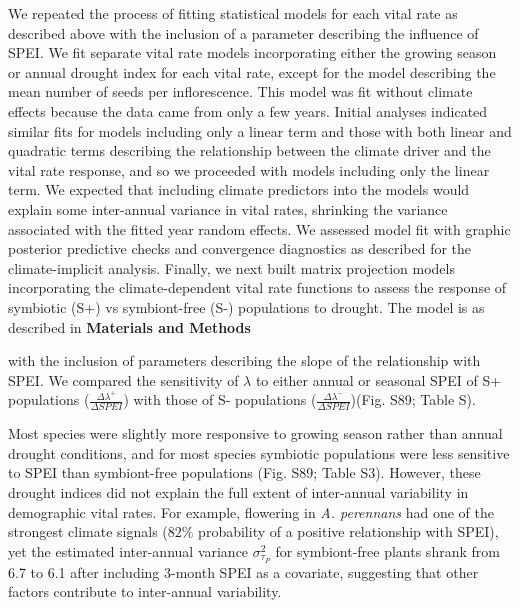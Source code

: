\documentclass[lineno,sn-nature]{sn-jnl}%
\providecommand{\DIFadd}[1]{{\protect\color{blue}#1}} %
\providecommand{\DIFadd}[1]{{\protect\color{blue}\uwave{#1}}} %
\begin{document}
\begin{appendices}
{	\DIFadd{We repeated the process of fitting statistical models for each vital rate as described above with the inclusion of a parameter describing the influence of SPEI. 
	We fit separate vital rate models incorporating either the growing season or annual drought index for each vital rate, except for the model describing the mean number of seeds per inflorescence. 
	This model was fit without climate effects because the data came from only a few years.
	Initial analyses indicated similar fits for models including only a linear term and those with both linear and quadratic terms describing the relationship between the climate driver and the vital rate response, and so we proceeded with models including only the linear term.
	We expected that including climate predictors into the models would explain some inter-annual variance in vital rates, shrinking the variance associated with the fitted year random effects.
	We assessed model fit with graphic posterior predictive checks and convergence diagnostics as described for the climate-implicit analysis. 
	Finally, we next built matrix projection models incorporating the climate-dependent vital rate functions to assess the response of symbiotic (S+) vs symbiont-free (S-) populations to drought. 
	The model is as described in }\textbf{\DIFadd{Materials and Methods}} \DIFadd{with the inclusion of parameters describing the slope of the relationship with SPEI. 
	We compared the sensitivity of $\lambda$ to either annual or seasonal SPEI of S+ populations ($\frac{\Delta\lambda^{+}}{\Delta SPEI}$) with those of S- populations ($\frac{\Delta\lambda^{-}}{\Delta SPEI}$)(Fig. S89; Table S).
	
}

	\DIFadd{Most species were slightly more responsive to growing season rather than annual drought conditions, and for most species symbiotic populations were less sensitive to SPEI than symbiont-free populations (Fig. S89; Table S3).
	However, these drought indices did not explain the full extent of inter-annual variability in demographic vital rates.
	For example, flowering in }\emph{\DIFadd{A. perennans}} \DIFadd{had one of the strongest climate signals ($82\%$ probability of a positive relationship with SPEI), yet the estimated inter-annual variance $\sigma^2_{\tau_{P}}$ for symbiont-free plants shrank from 6.7 to 6.1 after including 3-month SPEI as a covariate, suggesting that other factors contribute to inter-annual variability.
}}


\end{appendices}
\end{document}
